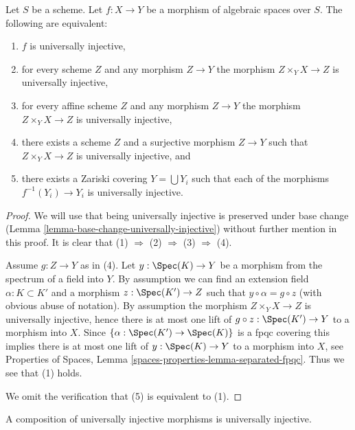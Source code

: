 \begin{lemma}
\label{lemma-universally-injective-local}
Let $S$ be a scheme.
Let $f : X \to Y$ be a morphism of algebraic spaces over $S$.
The following are equivalent:
\begin{enumerate}
\item $f$ is universally injective,
\item for every scheme $Z$ and any morphism $Z \to Y$ the morphism
$Z \times_Y X \to Z$ is universally injective,
\item for every affine scheme $Z$ and any morphism
$Z \to Y$ the morphism $Z \times_Y X \to Z$ is universally injective,
\item there exists a scheme $Z$ and a surjective morphism
$Z \to Y$ such that $Z \times_Y X \to Z$ is universally injective, and
\item there exists a Zariski covering $Y = \bigcup Y_i$ such that
each of the morphisms $f^{-1}(Y_i) \to Y_i$ is universally injective.
\end{enumerate}
\end{lemma}

\begin{proof}
We will use that being universally injective is preserved under base change
(Lemma \ref{lemma-base-change-universally-injective})
without further mention in this proof.
It is clear that (1) $\Rightarrow$ (2) $\Rightarrow$ (3)
$\Rightarrow$ (4).

\medskip\noindent
Assume $g : Z \to Y$ as in (4). Let $y : \Spec(K) \to Y$ be a
morphism from the spectrum of a field into $Y$. By assumption we
can find an extension field $\alpha : K \subset K'$ and a morphism
$z : \Spec(K') \to Z$ such that $y \circ \alpha = g \circ z$
(with obvious abuse of notation). By assumption the
morphism $Z \times_Y X \to Z$ is universally injective, hence there
is at most one
lift of $g \circ z : \Spec(K') \to Y$ to a morphism into $X$.
Since $\{\alpha : \Spec(K') \to \Spec(K)\}$ is a
fpqc covering this implies there is at most one lift of
$y : \Spec(K) \to Y$ to a morphism into $X$, see
Properties of Spaces, Lemma \ref{spaces-properties-lemma-separated-fpqc}.
Thus we see that (1) holds.

\medskip\noindent
We omit the verification that (5) is equivalent to (1).
\end{proof}

\begin{lemma}
\label{lemma-composition-universally-injective}
A composition of universally injective morphisms is universally injective.
\end{lemma}

